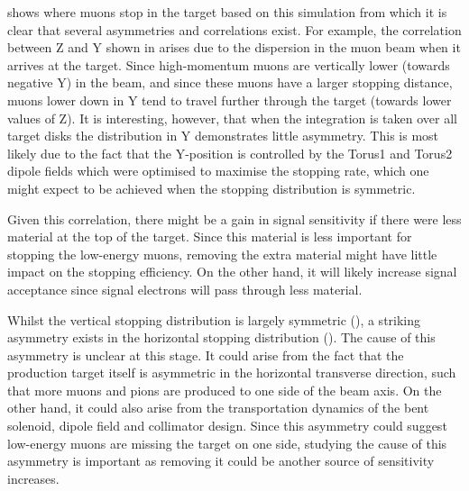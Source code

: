  shows where muons stop in the target based on this simulation from which it is clear that several asymmetries and correlations exist.
For example, the correlation between Z and Y shown in  arises due to the dispersion in the muon beam when it arrives at the target. 
Since high-momentum muons are vertically lower (towards negative Y) in the beam, and since these muons have a larger stopping distance, muons lower down in Y tend to travel further through the target (towards lower values of Z).
It is interesting, however, that when the integration is taken over all target disks the distribution in Y demonstrates little asymmetry. 
This is most likely due to the fact that the Y-position is controlled by the Torus1 and Torus2 dipole fields which were optimised to maximise the stopping rate, which one might expect to be achieved when the stopping distribution is symmetric.

\FigSensMuStopsTwoD
Given this correlation, there might be a gain in signal sensitivity if there were less material at the top of the target.
Since this material is less important for stopping the low-energy muons, removing the extra material might have little impact on the stopping efficiency.
On the other hand, it will likely increase signal acceptance since signal electrons will pass through less material.

Whilst the vertical stopping distribution is largely symmetric (),
a striking asymmetry exists in the horizontal stopping distribution ().
The cause of this asymmetry is unclear at this stage.
It could arise from the fact that the production target itself is asymmetric in the horizontal transverse direction, such that more muons and pions are produced to one side of the beam axis.
On the other hand, it could also arise from the transportation dynamics of the bent solenoid, dipole field and collimator design. 
Since this asymmetry could suggest low-energy muons are missing the target on one side, studying the cause of this asymmetry is important as removing it could be another source of sensitivity increases.


